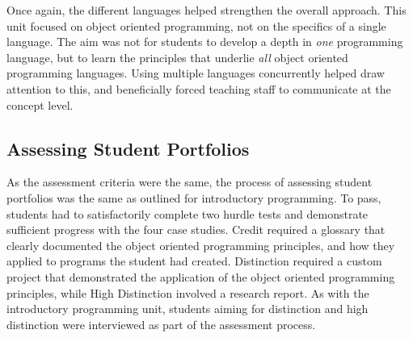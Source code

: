 
Once again, the different languages helped strengthen the overall approach. This unit focused on object oriented programming, not on the specifics of a single language. The aim was not for students to develop a depth in \emph{one} programming language, but to learn the principles that underlie \emph{all} object oriented programming languages. Using multiple languages concurrently helped draw attention to this, and beneficially forced teaching staff to communicate at the concept level. 


\subsection{Assessing Student Portfolios} %
\label{sub:oop_assessing_student_portfolios}

As the assessment criteria were the same, the process of assessing student portfolios was the same as outlined for introductory programming. To pass, students had to satisfactorily complete two hurdle tests and demonstrate sufficient progress with the four case studies. Credit required a glossary that clearly documented the object oriented programming principles, and how they applied to programs the student had created. Distinction required a custom project that demonstrated the application of the object oriented programming principles, while High Distinction involved a research report. As with the introductory programming unit, students aiming for distinction and high distinction were interviewed as part of the assessment process.

